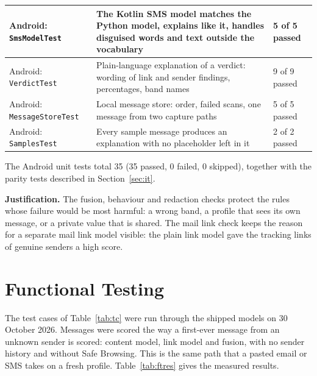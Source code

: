 {{\begin{longtable}{|p{3.0cm}|p{7.6cm}|p{3.4cm}|}
Android: \texttt{SmsModelTest} & The Kotlin SMS model matches the Python model, explains like it, handles disguised words and text outside the vocabulary & 5 of 5 passed \\ \hline
Android: \texttt{VerdictTest} & Plain-language explanation of a verdict: wording of link and sender findings, percentages, band names & 9 of 9 passed \\ \hline
Android: \texttt{MessageStoreTest} & Local message store: order, failed scans, one message from two capture paths & 5 of 5 passed \\ \hline
Android: \texttt{SamplesTest} & Every sample message produces an explanation with no placeholder left in it & 2 of 2 passed \\ \hline
\end{longtable}
}

The Android unit tests total 35 (35 passed, 0 failed, 0 skipped), together with the parity tests described in Section~\ref{sec:it}.

\textbf{Justification.} The fusion, behaviour and redaction checks protect the rules whose failure would be most harmful: a wrong band, a profile that sees its own message, or a private value that is shared. The mail link check keeps the reason for a separate mail link model visible: the plain link model gave the tracking links of genuine senders a high score.

\section{Functional Testing}\label{sec:ft}
The test cases of Table~\ref{tab:tc} were run through the shipped models on 30 October 2026. Messages were scored the way a first-ever message from an unknown sender is scored: content model, link model and fusion, with no sender history and without Safe Browsing. This is the same path that a pasted email or SMS takes on a fresh profile. Table~\ref{tab:ftres} gives the measured results.

}
